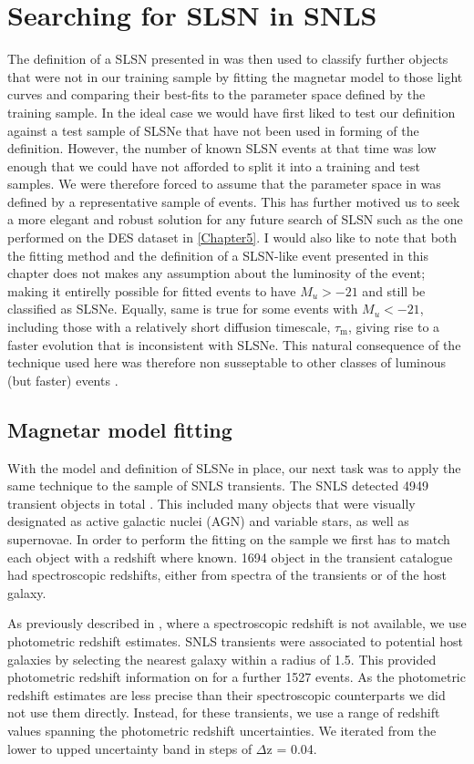 \section{Searching for SLSN in SNLS}
The definition of a SLSN presented in  was then used to classify further objects that were not in our training sample by fitting the magnetar model to those light curves and comparing their best-fits to the parameter space defined by the training sample. In the ideal case we would have first liked to test our definition against a test sample of SLSNe that have not been used in forming of the definition. However, the number of known SLSN events at that time was low enough that we could have not afforded to split it into a training and test samples. We were therefore forced to assume that the parameter space in  was defined by a representative sample of events. This has further motived us to seek a more elegant and robust solution for any future search of SLSN such as the one performed on the DES dataset in \cref{Chapter5}. I would also like to note that both the fitting method and the definition of a SLSN-like event presented in this chapter does not makes any assumption about the luminosity of the event; making it entirelly possible for fitted events to have $M_u>-21$ and still be classified as SLSNe. Equally, same is true for some events with $M_u<-21$, including those with a relatively short diffusion timescale, $\tau_\mathrm{m}$, giving rise to a faster evolution that is inconsistent with SLSNe. This natural consequence of the technique used here was therefore non susseptable to other classes of luminous (but faster) events \citep{Arcavi15}.

\subsection{Magnetar model fitting}
With the model and definition of SLSNe in place, our next task was to apply the same technique to the sample of SNLS transients. The SNLS detected 4949 transient objects in total \citep{Perrett2010}. This included many objects that were visually designated as active galactic nuclei (AGN) and variable stars, as well as supernovae. In order to perform the fitting on the sample we first has to match each object with a redshift where known. 1694 object in the transient catalogue had spectroscopic redshifts, either from spectra of the transients or of the host galaxy.


As previously described in , where a spectroscopic redshift is not available, we use photometric redshift estimates. SNLS transients were associated to potential host galaxies by selecting the nearest galaxy within a radius of 1.5\arcsec. This provided photometric redshift information on for a further 1527 events. As the photometric redshift estimates are less precise than their spectroscopic counterparts we did not use them directly. Instead, for these transients, we use a range of redshift values spanning the photometric redshift uncertainties. We iterated from the lower to upped uncertainty band in steps of $\Delta$z = 0.04.

